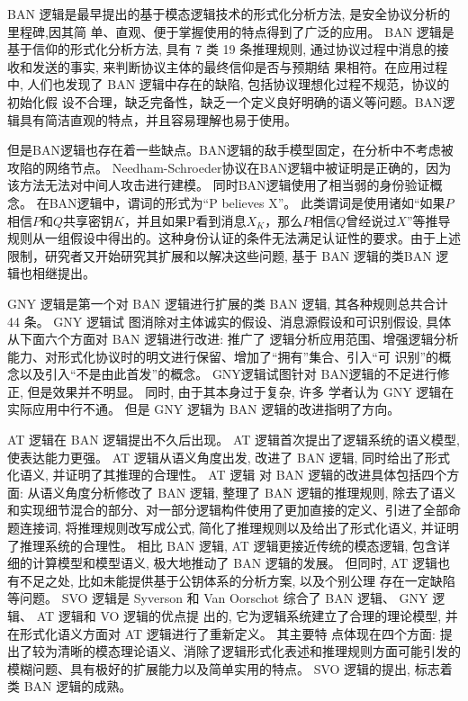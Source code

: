 BAN 逻辑是最早提出的基于模态逻辑技术的形式化分析方法, 是安全协议分析的里程碑,因其简
单、直观、便于掌握使用的特点得到了广泛的应用。 BAN 逻辑是基于信仰的形式化分析方法, 具有 7 类 19
条推理规则, 通过协议过程中消息的接收和发送的事实, 来判断协议主体的最终信仰是否与预期结
果相符。在应用过程中, 人们也发现了 BAN 逻辑中存在的缺陷, 包括协议理想化过程不规范，协议的初始化假
设不合理，缺乏完备性，缺乏一个定义良好明确的语义等问题。BAN逻辑具有简洁直观的特点，并且容易理解也易于使用。

但是BAN逻辑也存在着一些缺点。BAN逻辑的敌手模型固定，在分析中不考虑被攻陷的网络节点。 Needham-Schroeder协议在BAN逻辑中被证明​​是正确的，因为该方法无法对中间人攻击进行建模。 同时BAN逻辑使用了相当弱的身份验证概念。 在BAN逻辑中，谓词的形式为“P believes X”。 此类谓词是使用诸如“如果$P$相信$P$和$Q$共享密钥$K$，并且如果P看到消息${X}_K$，那么$P$相信$Q$曾经说过$X$”等推导规则从一组假设中得出的。这种身份认证的条件无法满足认证性的要求。由于上述限制，研究者又开始研究其扩展和以解决这些问题, 基于 BAN 逻辑的类BAN 逻辑也相继提出。

GNY 逻辑\cite{mathuria1995automation}是第一个对 BAN 逻辑进行扩展的类 BAN 逻辑, 其各种规则总共合计 44 条。 GNY 逻辑试
图消除对主体诚实的假设、消息源假设和可识别假设, 具体从下面六个方面对 BAN 逻辑进行改进: 推广了
逻辑分析应用范围、增强逻辑分析能力、对形式化协议时的明文进行保留、增加了“拥有”集合、引入“可
识别”的概念以及引入“不是由此首发”的概念。
GNY逻辑试图针对 BAN逻辑的不足进行修正, 但是效果并不明显。 同时, 由于其本身过于复杂, 许多
学者认为 GNY 逻辑在实际应用中行不通。 但是 GNY 逻辑为 BAN 逻辑的改进指明了方向。

AT 逻辑\cite{Abadi1991}在 BAN 逻辑提出不久后出现。 AT 逻辑首次提出了逻辑系统的语义模型, 使表达能力更强。
AT 逻辑从语义角度出发, 改进了 BAN 逻辑, 同时给出了形式化语义, 并证明了其推理的合理性。 AT 逻辑
对 BAN 逻辑的改进具体包括四个方面: 从语义角度分析修改了 BAN 逻辑, 整理了 BAN 逻辑的推理规则,
除去了语义和实现细节混合的部分、对一部分逻辑构件使用了更加直接的定义、引进了全部命题连接词,
将推理规则改写成公式, 简化了推理规则以及给出了形式化语义, 并证明了推理系统的合理性。
相比 BAN 逻辑, AT 逻辑更接近传统的模态逻辑, 包含详细的计算模型和模型语义, 极大地推动了
BAN 逻辑的发展。 但同时, AT 逻辑也有不足之处, 比如未能提供基于公钥体系的分析方案, 以及个别公理
存在一定缺陷等问题。
SVO 逻辑\cite{Syverson1996}是 Syverson 和 Van Oorschot 综合了 BAN 逻辑、 GNY 逻辑、 AT 逻辑和 VO 逻辑的优点提
出的, 它为逻辑系统建立了合理的理论模型, 并在形式化语义方面对 AT 逻辑进行了重新定义。 其主要特
点体现在四个方面: 提出了较为清晰的模态理论语义、消除了逻辑形式化表述和推理规则方面可能引发的
模糊问题、具有极好的扩展能力以及简单实用的特点。
SVO 逻辑的提出, 标志着类 BAN 逻辑的成熟。

